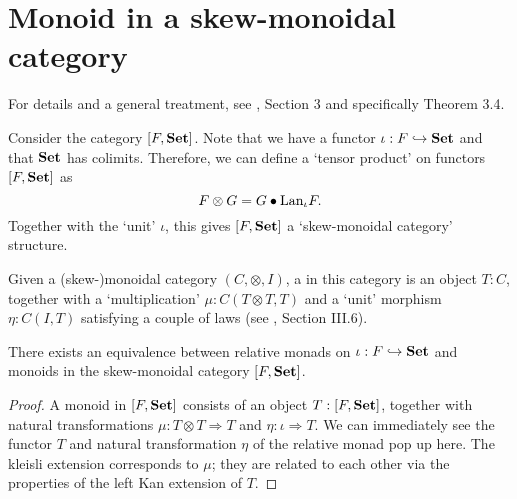 \section{Monoid in a skew-monoidal category}
For details and a general treatment, see \autocite{monads-endofunctors}, Section 3 and specifically Theorem 3.4.

\begin{definition}
  Consider the category $ [F, \mathbf{Set}] $. Note that we have a functor $ \iota: F \hookrightarrow \mathbf{Set} $ and that $ \mathbf{Set} $ has colimits. Therefore, we can define a `tensor product' on functors $ [F, \mathbf{Set}] $ as
  \[ F \otimes G = G \bullet \text{Lan}_{\iota}F. \]
  Together with the `unit' $ \iota $, this gives $ [F, \mathbf{Set}] $ a `skew-monoidal category' structure.
\end{definition}

\begin{definition}
  Given a (skew-)monoidal category $ (C, \otimes, I) $, a  in this category is an object $ T : C $, together with a `multiplication' $ \mu: C(T \otimes T, T) $ and a `unit' morphism $ \eta: C(I, T) $ satisfying a couple of laws (see \autocite{MacLane}, Section III.6).
\end{definition}

\begin{lemma}
  There exists an equivalence between relative monads on $ \iota: F \hookrightarrow \mathbf{Set} $ and monoids in the skew-monoidal category $ [F, \mathbf{Set}] $.
\end{lemma}
\begin{proof}
  A monoid in $ [F, \mathbf{Set}] $ consists of an object $ T: [F, \mathbf{Set}] $, together with natural transformations $ \mu: T \otimes T \Rightarrow T $ and $ \eta: \iota \Longrightarrow T $. We can immediately see the functor $ T $ and natural transformation $ \eta $ of the relative monad pop up here. The kleisli extension corresponds to $ \mu $; they are related to each other via the properties of the left Kan extension of $ T $.
\end{proof}
